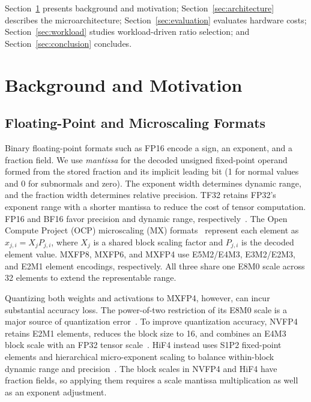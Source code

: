 \documentclass[conference,10pt,letterpaper]{IEEEtran}
\begin{document}
Section~\ref{sec:background} presents background and motivation; Section~\ref{sec:architecture} describes the microarchitecture; Section~\ref{sec:evaluation} evaluates hardware costs; Section~\ref{sec:workload} studies workload-driven ratio selection; and Section~\ref{sec:conclusion} concludes.



\section{Background and Motivation}
\label{sec:background}

\subsection{Floating-Point and Microscaling Formats}
\label{sec:formats}

Binary floating-point formats such as FP16 encode a sign, an exponent, and a fraction field. We use \emph{mantissa} for the decoded unsigned fixed-point operand formed from the stored fraction and its implicit leading bit (1 for normal values and 0 for subnormals and zero). The exponent width determines dynamic range, and the fraction width determines relative precision. TF32 retains FP32's exponent range with a shorter mantissa to reduce the cost of tensor computation. FP16 and BF16 favor precision and dynamic range, respectively~\cite{burgess2019bfloat16}. The Open Compute Project (OCP) microscaling (MX) formats~\cite{ocpmx2023} represent each element as $x_{j,i}=X_jP_{j,i}$, where $X_j$ is a shared block scaling factor and $P_{j,i}$ is the decoded element value. MXFP8, MXFP6, and MXFP4 use E5M2/E4M3, E3M2/E2M3, and E2M1 element encodings, respectively. All three share one E8M0 scale across 32 elements to extend the representable range.

Quantizing both weights and activations to MXFP4, however, can incur substantial accuracy loss. The power-of-two restriction of its E8M0 scale is a major source of quantization error~\cite{egiazarian2026bridging,zhang2026benchmarking}. To improve quantization accuracy, NVFP4 retains E2M1 elements, reduces the block size to 16, and combines an E4M3 block scale with an FP32 tensor scale~\cite{nvidia2024nvfp4}. HiF4 instead uses S1P2 fixed-point elements and hierarchical micro-exponent scaling to balance within-block dynamic range and precision~\cite{hifloat4}. The block scales in NVFP4 and HiF4 have fraction fields, so applying them requires a scale mantissa multiplication as well as an exponent adjustment.
\end{document}
